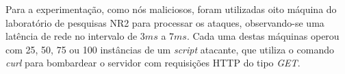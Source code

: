 Para a experimentação, como nós maliciosos, foram utilizadas oito máquina do laboratório de pesquisas NR2 para processar os ataques, observando-se uma latência de rede no intervalo de $3ms$ a $7ms$. Cada uma destas máquinas operou com 25, 50, 75 ou 100 instâncias de um \emph{script} atacante, que utiliza o comando \emph{curl} para bombardear o servidor com requisições HTTP do tipo \emph{GET}. %


